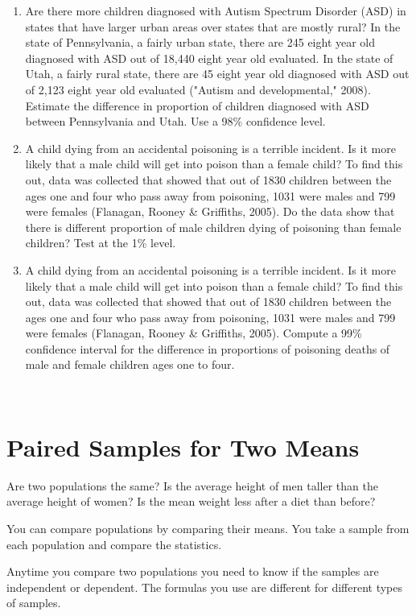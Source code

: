 \documentclass[]{book}
\begin{document}
\begin{enumerate}
\item
  Are there more children diagnosed with Autism Spectrum Disorder (ASD) in states that have larger urban areas over states that are mostly rural? In the state of Pennsylvania, a fairly urban state, there are 245 eight year old diagnosed with ASD out of 18,440 eight year old evaluated. In the state of Utah, a fairly rural state, there are 45 eight year old diagnosed with ASD out of 2,123 eight year old evaluated ("Autism and developmental," 2008). Estimate the difference in proportion of children diagnosed with ASD between Pennsylvania and Utah. Use a 98\% confidence level.
\item
  A child dying from an accidental poisoning is a terrible incident. Is it more likely that a male child will get into poison than a female child? To find this out, data was collected that showed that out of 1830 children between the ages one and four who pass away from poisoning, 1031 were males and 799 were females (Flanagan, Rooney \& Griffiths, 2005). Do the data show that there is different proportion of male children dying of poisoning than female children? Test at the 1\% level.
\item
  A child dying from an accidental poisoning is a terrible incident. Is it more likely that a male child will get into poison than a female child? To find this out, data was collected that showed that out of 1830 children between the ages one and four who pass away from poisoning, 1031 were males and 799 were females (Flanagan, Rooney \& Griffiths, 2005). Compute a 99\% confidence interval for the difference in proportions of poisoning deaths of male and female children ages one to four.
\end{enumerate}

\textbf{\\
}

\hypertarget{paired-samples-for-two-means}{%
\section{Paired Samples for Two Means}\label{paired-samples-for-two-means}}

Are two populations the same? Is the average height of men taller than the average height of women? Is the mean weight less after a diet than before?

You can compare populations by comparing their means. You take a sample from each population and compare the statistics.

Anytime you compare two populations you need to know if the samples are independent or dependent. The formulas you use are different for different types of samples.
\end{document}
